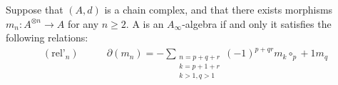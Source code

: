 \documentclass[../thesis.tex]{subfiles}
\begin{document}
        \begin{proposition}
            Suppose that $(A, d)$ is a chain complex, and that there exists morphisms $m_n: A^{\otimes n} \rightarrow A$ for any $n\geq 2$. A is an $A_\infty$-algebra if and only it satisfies the following relations:
            \begin{align*}
                (\text{rel'}_n)\qquad & \partial(m_n) = -\sum_{\substack{n = p + q + r \\ k = p + 1 + r \\ k > 1, q > 1}}(-1)^{p + qr}m_k\circ_p+1m_q
            \end{align*}
        \end{proposition}

        
\end{document}
